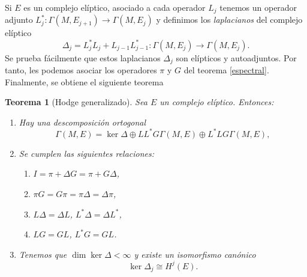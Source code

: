 \documentclass[12pt,a4paper]{article}
\newtheorem{thm}{Teorema}[section]
\theoremstyle{definition} \newtheorem{defn}[thm]{Definición}
\theoremstyle{definition} \newtheorem{ejemplo}[thm]{Ejemplo}
\theoremstyle{definition} \newtheorem{ejercicio}[thm]{Ejercicio}
\theoremstyle{remark} \newtheorem*{obs}{Observación}
\begin{document}
   Si $E$ es un complejo elíptico, asociado a cada operador $L_j$ tenemos un operador adjunto $L_j^*:\Gamma(M,E_{j+1}) \rightarrow \Gamma(M,E_j)$ y definimos los \emph{laplacianos} del complejo elíptico 
   \begin{equation*}
     \Delta_j=L_j^*L_j + L_{j-1}L^*_{j-1}: \Gamma(M,E_j) \rightarrow \Gamma(M,E_j).
   \end{equation*}
   Se prueba fácilmente que estos laplacianos $\Delta_j$ son elípticos y autoadjuntos. Por tanto, les podemos asociar los operadores $\pi$ y $G$ del teorema \ref{espectral}. Finalmente, se obtiene el siguiente teorema
\begin{thm}[Hodge generalizado]
  Sea $E$ un complejo elíptico. Entonces:
  \begin{enumerate}
    \item Hay una descomposición ortogonal
      \begin{equation*}
	\Gamma(M,E)= \ker \Delta \oplus LL^*G\Gamma(M,E) \oplus L^*LG\Gamma(M,E),
      \end{equation*}
    \item Se cumplen las siguientes relaciones:
      \begin{enumerate}
	\item $I=\pi+\Delta G = \pi+G\Delta$,
	\item $\pi G=G\pi=\pi \Delta=\Delta \pi$,
	\item $L\Delta=\Delta L$, $L^*\Delta=\Delta L^*$,
	\item $LG=GL$, $L^*G=GL$.
      \end{enumerate}
    \item Tenemos que $\dim \ker \Delta < \infty$ y existe un isomorfismo canónico
      \begin{equation*}
	\ker \Delta_j \cong H^j(E).
      \end{equation*}
  \end{enumerate}
\end{thm}
  
\end{document}
